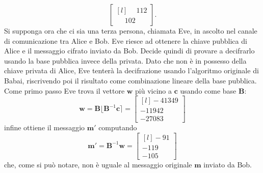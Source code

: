 \begin{exmp}
\[\begin{bmatrix*}[l]
        \phantom{-}112 \\
        \phantom{-}102
    \end{bmatrix*}.
\]
Si supponga ora che ci sia una terza persona, chiamata Eve, in ascolto nel canale di 
comunicazione tra Alice e Bob. Eve riesce ad ottenere la chiave pubblica di Alice e il 
messaggio cifrato inviato da Bob. Decide quindi di provare a decifrarlo usando la base 
pubblica invece della privata. 
Dato che non è in possesso della chiave privata di Alice, Eve tenterà la 
decifrazione usando l'algoritmo originale di Babai, riscrivendo poi il risultato come 
combinazione lineare della base pubblica. 
\\
Come primo passo Eve trova il vettore $\mathbf{w}$
più vicino a $\mathbf{c}$ usando come base $\mathbf{B}$:
\[
    \mathbf{w} = \mathbf{B} \lfloor \mathbf{B}^{-1}\mathbf{c}\rceil = 
    \begin{bmatrix*}[l]
        -41349 \\
        -11942 \\
        -27083 
    \end{bmatrix*}
\]
infine ottiene il messaggio $\mathbf{m}'$ computando
\[
    \mathbf{m}' = \mathbf{B}^{-1}\mathbf{w} = 
    \begin{bmatrix*}[l]
        -91 \\
        -119 \\
        -105 
    \end{bmatrix*}
\]
che, come si può notare, non è uguale al messaggio originale $\mathbf{m}$ inviato da Bob. 
\end{exmp}